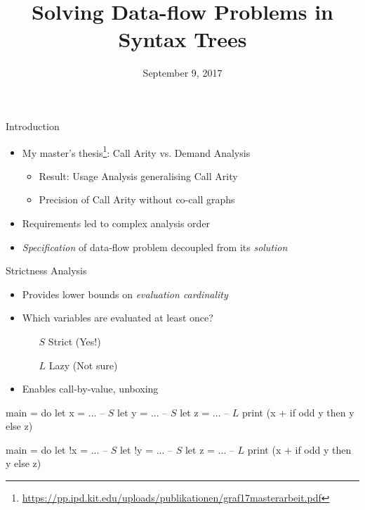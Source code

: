 \documentclass{haskellbeamer}
\title{Solving Data-flow Problems in Syntax Trees}
\date{September 9, 2017}
\begin{document}
\maketitle

\begin{frame}{Introduction}
  \begin{itemize}
    \item My master's thesis\footnote{\tiny\url{https://pp.ipd.kit.edu/uploads/publikationen/graf17masterarbeit.pdf}}: Call Arity vs. Demand Analysis
      \begin{itemize}
        \item Result: Usage Analysis generalising Call Arity
        \item Precision of Call Arity without co-call graphs
      \end{itemize}
    \item Requirements led to complex analysis order
    \item \emph{Specification} of data-flow problem decoupled from its \emph{solution}
  \end{itemize}
\end{frame}

\begin{frame}[fragile]{Strictness Analysis}
  \begin{itemize}
    \item Provides lower bounds on \emph{evaluation cardinality}
    \item Which variables are evaluated at least once?
      \begin{itemize}
        \item[$S$] Strict (Yes!)
        \item[$L$] Lazy (Not sure)
      \end{itemize}
    \item Enables call-by-value, unboxing
  \end{itemize}
  \begin{overprint}
    \begin{center}
      \begin{minipage}{0.5\textwidth}
        \begin{haskell}
          main = do
            let  x = ... -- $S$
            let  y = ... -- $S$
            let  z = ... -- $L$
            print (x + if odd y then y else z)
        \end{haskell}
      \end{minipage}
    \end{center}
    \begin{center}
      \begin{minipage}{0.5\textwidth}
        \begin{haskell}
          main = do
            let !x = ... -- $S$
            let !y = ... -- $S$
            let  z = ... -- $L$
            print (x + if odd y then y else z)
        \end{haskell}
      \end{minipage}
    \end{center}
  \end{overprint}
\end{frame}
\end{document}
